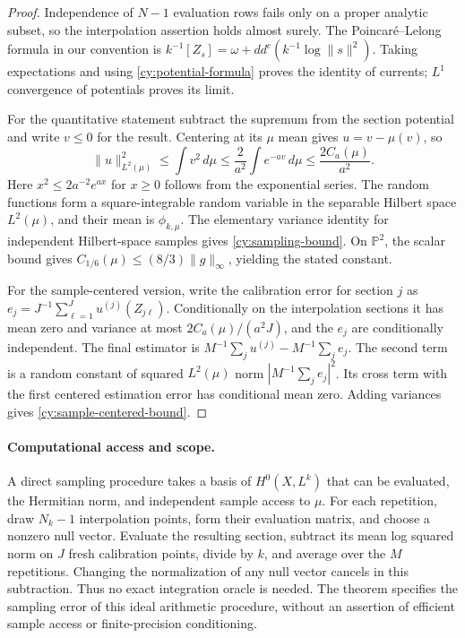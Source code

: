 \begin{proof}
Independence of $N-1$ evaluation rows fails only on a proper analytic
subset, so the interpolation assertion holds almost surely. The
Poincar\'e--Lelong formula in our convention is
$k^{-1}[Z_s]=\omega+dd^c(k^{-1}\log\|s\|^2)$.
Taking expectations and using \eqref{cy:potential-formula} proves the
identity of currents; $L^1$ convergence of potentials proves its limit.

For the quantitative statement subtract the supremum from the section
potential and write $v\le0$ for the result. Centering at its $\mu$ mean
gives $u=v-\mu(v)$, so
\[
 \|u\|_{L^2(\mu)}^2\le\int v^2\,d\mu
              \le\frac2{a^2}\int e^{-av}\,d\mu
              \le\frac{2C_a(\mu)}{a^2}.
\]
Here $x^2\le2a^{-2}e^{ax}$ for $x\ge0$ follows from the exponential
series. The random functions form a square-integrable random variable
in the separable Hilbert space $L^2(\mu)$, and their mean is
$\phi_{k,\mu}$. The elementary variance identity for independent
Hilbert-space samples gives \eqref{cy:sampling-bound}.
On $\mathbb P^2$, the scalar bound gives
$C_{1/6}(\mu)\le(8/3)\|g\|_\infty$, yielding the stated constant.

For the sample-centered version, write the calibration error for section
$j$ as $e_j=J^{-1}\sum_{\ell=1}^J u^{(j)}(Z_{j\ell})$.
Conditionally on the interpolation sections it has mean zero and
variance at most $2C_a(\mu)/(a^2J)$, and the $e_j$ are conditionally
independent. The final estimator is
$M^{-1}\sum_j u^{(j)}-M^{-1}\sum_j e_j$.
The second term is a random constant of squared $L^2(\mu)$ norm
$|M^{-1}\sum_j e_j|^2$. Its cross term with the first centered
estimation error has conditional mean zero. Adding variances gives
\eqref{cy:sample-centered-bound}.
\end{proof}

\paragraph{Computational access and scope.}
A direct sampling procedure takes a basis of $H^0(X,L^k)$ that can be
evaluated, the Hermitian norm, and independent sample access to $\mu$.
For each repetition, draw $N_k-1$ interpolation points, form their
evaluation matrix, and choose a nonzero null vector. Evaluate the
resulting section, subtract its mean log squared norm on $J$ fresh calibration
points, divide by $k$, and average over the $M$ repetitions. Changing
the normalization of any null vector cancels in this subtraction.
Thus no exact integration oracle is needed. The theorem specifies the
sampling error of this ideal arithmetic procedure, without an assertion
of efficient sample access or finite-precision conditioning.

